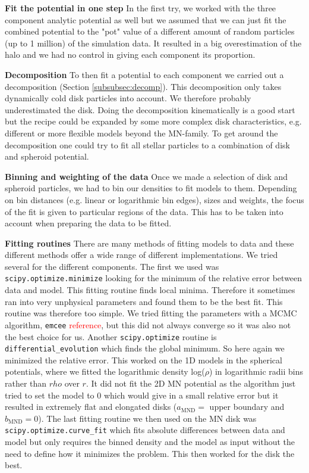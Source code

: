\textbf{Fit the potential in one step}
In the first try, we worked with the three component analytic potential as well but we assumed that we can just fit the combined potential to the "pot" value of a different amount of random particles (up to 1 million) of the simulation data. It resulted in a big overestimation of the halo and we had no control in giving each component its proportion.

\textbf{Decomposition}
To then fit a potential to each component we carried out a decomposition (Section \ref{subsubsec:decomp}). This decomposition only takes dynamically cold disk particles into account. We therefore probably underestimated the disk. Doing the decomposition kinematically is a good start but the recipe could be expanded by some more complex disk characteristics, e.g. different or more flexible models beyond the \ac{MN}-family. To get around the decomposition one could try to fit all stellar particles to a combination of disk and spheroid potential.

\textbf{Binning and weighting of the data}
Once we made a selection of disk and spheroid particles, we had to bin our densities to fit models to them. Depending on bin distances (e.g. linear or logarithmic bin edges), sizes and weights, the focus of the fit is given to particular regions of the data. This has to be taken into account when preparing the data to be fitted.

\textbf{Fitting routines}
There are many methods of fitting models to data and these different methods offer a wide range of different implementations. We tried several for the different components. The first we used was \texttt{scipy.optimize.minimize} looking for the minimum of the relative error between data and model. This fitting routine finds local minima. Therefore it sometimes ran into very unphysical parameters and found them to be the best fit. This routine was therefore too simple. We tried fitting the parameters with a MCMC algorithm, \texttt{emcee} \textcolor{red}{reference}, but this did not always converge so it was also not the best choice for us. Another \texttt{scipy.optimize} routine is \texttt{differential\_evolution} which finds the global minimum. So here again we minimized the relative error. This worked on the 1D models in the spherical potentials, where we fitted the logarithmic density log($\rho$) in logarithmic radii bins rather than $rho$ over $r$. It did not fit the 2D \ac{MN} potential as the algorithm just tried to set the model to 0 which would give in a small relative error but it resulted in extremely flat and elongated disks ($a_\mathrm{MND} = $ upper boundary and $b_\mathrm{MND} = 0$). The last fitting routine we then used on the \ac{MN} disk was \texttt{scipy.optimize.curve\_fit} which fits absolute differences between data and model but only requires the binned density and the model as input without the need to define how it minimizes the problem. This then worked for the disk the best. 

